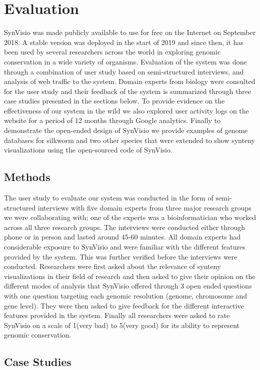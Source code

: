 \chapter{Evaluation}

SynVisio was made publicly available to use for free on the Internet on September 2018. A stable version was deployed in the start of 2019 and since then, it has been used by several researchers across the world in exploring genomic conservation in a wide variety of organisms. Evaluation of the system was done through a combination of user study based on semi-structured interviews, and analysis of web traffic to the system. Domain experts from biology were consulted for the user study and their feedback of the system is summarized through three case studies presented in the sections below. To provide evidence on the effectiveness of our system in the wild we also explored user activity logs on the website for a period of 12 months through Google analytics. Finally to demonstrate the open-ended design of SynVisio we provide examples of genome databases for silkworm and two other species that were extended to show synteny visualizations using the open-sourced code of SynVisio.

\section{Methods}
The user study to evaluate our system was conducted in the form of semi-structured interviews with five domain experts from three major research groups we were collaborating with; one of the experts was a bioinformatician who worked across all three research groups. The interviews were conducted either through phone or in person and lasted around 45-60 minutes. All domain experts had considerable exposure to SynVisio and were familiar with the different features provided by the system. This was further verified before the interviews were conducted. Researchers were first asked about the relevance of synteny visualizations in their field of research and then asked to give their opinion on the different modes of analysis that SynVisio offered through 3 open ended questions with one question targeting each genomic resolution (genome, chromosome and gene level). They were then asked to give feedback for the different interactive features provided in the system. Finally all researchers were asked to rate SynVisio on a scale of 1(very bad) to 5(very good) for its ability to represent genomic conservation.


\section{Case Studies}

